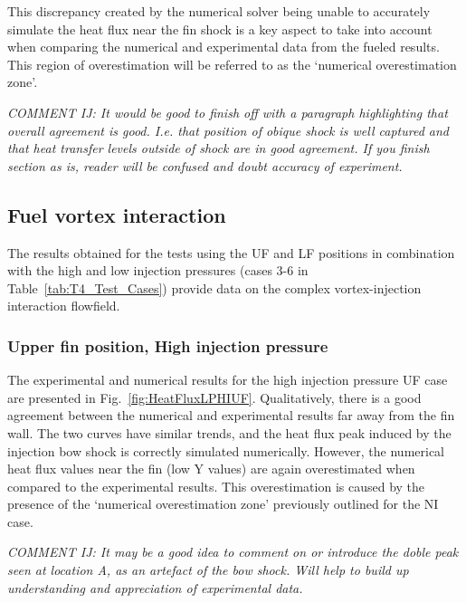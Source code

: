 \documentclass{AIAA}
\begin{document}
This discrepancy created by the numerical solver being unable to accurately simulate the heat flux near the fin shock is a key aspect to take into account when comparing the numerical and experimental data from the fueled results. 
This region of overestimation will be referred to as the `numerical overestimation zone'.


{\it COMMENT IJ: It would be good to finish off with a paragraph highlighting that overall agreement is good. I.e. that position of obique shock is well captured and that heat transfer levels outside of shock are in good agreement. If you finish section as is, reader will be confused and doubt accuracy of experiment.}


\subsection{Fuel vortex interaction}

The results obtained for the tests using the UF and LF positions in combination with the high and low injection pressures (cases 3-6 in Table~\ref{tab:T4_Test_Cases}) provide data on the complex vortex-injection interaction flowfield.

\subsubsection{Upper fin position, High injection pressure}

The experimental and numerical results for the high injection pressure UF case are presented in Fig.~\ref{fig:HeatFluxLPHIUF}.
Qualitatively, there is a good agreement between the numerical and experimental results far away from the fin wall.
The two curves have similar trends, and the heat flux peak induced by the injection bow shock is correctly simulated numerically.
However, the numerical heat flux values near the fin (low Y values) are again overestimated when compared to the experimental results.
This overestimation is caused by the presence of the `numerical overestimation zone' previously outlined for the NI case.

{\it COMMENT IJ: It may be a good idea to comment on or introduce the doble peak seen at location A, as an artefact of the bow shock. Will help to build up understanding and appreciation of experimental data.}
\end{document}
